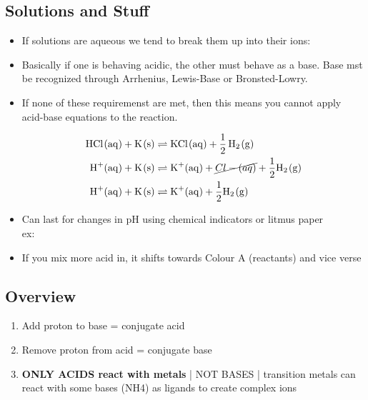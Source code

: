 \documentclass{article}
\begin{document}
\subsection{Solutions and Stuff}
\begin{itemize} \item If solutions are aqueous we tend to break them up into their ions: \\ \item Basically if one is behaving acidic, the other must behave as a base. Base mst be recognized through Arrhenius, Lewis-Base or Bronsted-Lowry. \item If none of these requiremenst are met, then this means you cannot apply acid-base equations to the reaction.  \\\begin{center}
\begin{align*}
\ce{HCl(aq) + K(s)} &\rightleftharpoons \ce{KCl(aq) + \frac{1}{2} H2(g)}\\
\ce{H+(aq) + K(s)} &\rightleftharpoons \ce{K+(aq) + \cancel{Cl-(aq)} + \frac{1}{2}H2(g)}\\
\ce{H+(aq) + K(s)} &\rightleftharpoons \ce{K+(aq) + \frac{1}{2}H2(g)}
\end{align*}
\end{center}

\item Can last for changes in pH using chemical indicators or litmus paper\\ex: 
\item If you mix more acid in, it shifts towards Colour A (reactants) and vice verse
\end{itemize}

\pagebreak
\subsection{Overview}
\begin{enumerate}
\item Add proton to base = conjugate acid
\item Remove proton from acid = conjugate base
\item \textbf{ONLY ACIDS react with metals} | NOT BASES | transition metals can react with some bases (NH4) as ligands to create complex ions
\end{enumerate}
\end{document}
